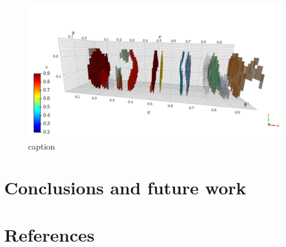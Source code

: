 \documentclass[12pt]{iopart}
\begin{document}
\begin{figure}[h!]
  \centering
    \includegraphics[width=\linewidth]{figures/3d_features.png}
  \caption{caption}
  \label{fig:coffee}
\end{figure}


\section{Conclusions and future work}

\section{References}
\end{document}

